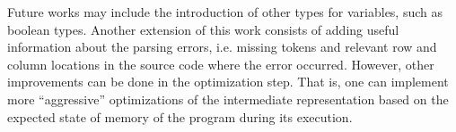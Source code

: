\documentclass[12pt,a4paper]{article}
\begin{document}
Future works may include the introduction of other types for variables, such as boolean types.
Another extension of this work consists of adding useful information about the parsing errors, i.e. missing tokens and relevant row and column locations in the source code where the error occurred.
However, other improvements can be done in the optimization step.
That is, one can implement more ``aggressive'' optimizations of the intermediate representation based on the expected state of memory of the program during its execution.
\end{document}
